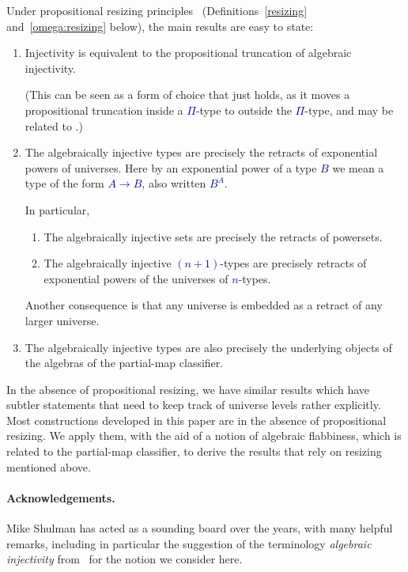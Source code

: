 \documentclass[10pt]{article}
\newcommand{\db}{\textcolor{darkblue}}
\newcommand{\m}[1]{\db{$#1$}}
\theoremstyle{definition}
\begin{document}
Under propositional resizing principles~\cite{hottbook}
(Definitions~\ref{resizing} and~\ref{omega:resizing} below), the main
results are easy to state:
\begin{enumerate}
\item Injectivity is equivalent to the propositional truncation of
  algebraic injectivity.

  (This can be seen as a form of choice that
  just holds, as it moves a propositional truncation inside a
  \m{\Pi}-type to outside the \m{\Pi}-type, and may be related to
  \cite{kenney:2011}.)
   \item The algebraically injective types are precisely the retracts of
     exponential powers of universes. Here by an exponential power of a type \m{B} we mean a type of the form \m{A \to B}, also written \m{B^A}.

     In particular,
       \begin{enumerate}
       \item The algebraically injective sets are precisely the
         retracts of powersets.

       \item The algebraically injective \m{(n+1)}-types are precisely
         retracts of exponential powers of the universes of \m{n}-types.
       \end{enumerate}
     Another consequence is that any universe is embedded as a retract of any
     larger universe.
   \item The algebraically injective types are also precisely the
       underlying objects of the algebras of the partial-map
       classifier.
\end{enumerate}
In the absence of propositional resizing, we have similar results
which have subtler statements that need to keep track of universe
levels rather explicitly.
%
Most constructions developed in this paper are in the absence of
propositional resizing. We apply them, with the aid of a notion of
algebraic flabbiness, which is related to the partial-map classifier,
to derive the results that rely on resizing mentioned above.

\paragraph{Acknowledgements.} Mike Shulman has acted as a sounding
board over the years, with many helpful remarks, including in
particular the suggestion of the terminology \emph{algebraic
  injectivity} from~\cite{bourke:2017} for the notion we consider
here.
\end{document}
